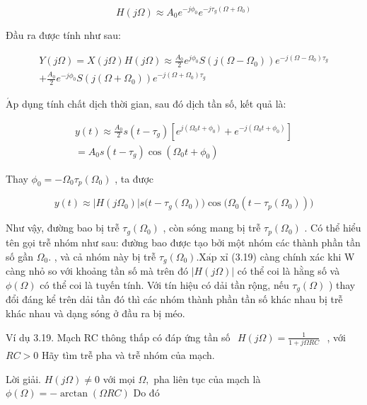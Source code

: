 \documentclass[
  10
]{article}
\begin{document}
\[
H (j \Omega) \approx A _ {0} e ^ {- j \phi_ {0}} e ^ {- j \tau_ {g} (\Omega + \Omega_ {0})}
\]

Đầu ra được tính như sau:

\[
\begin{array}{c} Y (j \Omega) = X (j \Omega) H (j \Omega) \approx \frac {A _ {0}}{2} e ^ {j \phi_ {0}} S (j (\Omega - \Omega_ {0})) e ^ {- j (\Omega - \Omega_ {0}) \tau_ {g}} \\ + \frac {A _ {0}}{2} e ^ {- j \phi_ {0}} S (j (\Omega + \Omega_ {0})) e ^ {- j (\Omega + \Omega_ {0}) \tau_ {g}} \end{array}
\]

\(\mathrm { { \acute { A } p } }\) dụng tính chất dịch thời gian, sau đó
dịch tần số, kết quả là:

\[
\begin{array}{r} y (t) \approx \frac {A _ {0}}{2} s (t - \tau_ {g}) \left[ e ^ {j (\Omega_ {0} t + \phi_ {0})} + e ^ {- j (\Omega_ {0} t + \phi_ {0})} \right] \\ = A _ {0} s (t - \tau_ {g}) \cos (\Omega_ {0} t + \phi_ {0}) \end{array}
\]

Thay \(\phi _ { 0 } = - \Omega _ { 0 } \tau _ { p } ( \Omega _ { 0 } )\)
, ta được

\[
y (t) \approx | H (j \Omega_ {0}) | s \big (t - \tau_ {g} (\Omega_ {0}) \big) \cos \big (\Omega_ {0} (t - \tau_ {p} (\Omega_ {0})) \big)\tag{3.19}
\]

Như vậy, đường bao bị trễ \(\tau _ { g } ( \Omega _ { 0 } )\) , còn sóng
mang bị trễ \(\tau _ { p } ( \Omega _ { 0 } )\) . Có thể hiểu tên gọi
trễ nhóm như sau: đường bao được tạo bởi một nhóm các thành phần tần số
gần \(\Omega _ { 0 } .\) , và cả nhóm này bị trễ
\(\tau _ { g } ( \Omega _ { 0 } ) . \mathrm { X } \acute { \mathrm { a p } }\)
xỉ (3.19) càng chính xác khi W càng nhỏ so với khoảng tần số mà trên đó
\(| H ( j \Omega ) |\) có thể coi là hằng số và \(\phi ( \Omega )\) có
thể coi là tuyến tính. Với tín hiệu có dải tần rộng, nếu
\(\tau _ { g } ( \Omega )\) ) thay đổi đáng kể trên dải tần đó thì các
nhóm thành phần tần số khác nhau bị trễ khác nhau và dạng sóng ở đầu ra
bị méo.

Ví dụ 3.19. Mạch RC thông thấp có đáp ứng tần số
\(\begin{array} { r } { H ( j \Omega ) = \frac { 1 } { 1 + j \Omega R C } } \end{array}\)
, với \(R C > 0\) Hãy tìm trễ pha và trễ nhóm của mạch.

Lời giải. \(H ( j \Omega ) \neq 0\) với mọi \(\Omega ,\) pha liên tục
của mạch là \(\phi ( \Omega ) = - \arctan ( \Omega R C )\) Do đó
\end{document}
